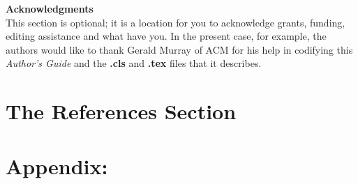 \documentclass[runningheads,a4paper]{llncs}
\begin{document}
\textbf{Acknowledgments} \\
This section is optional; it is a location for you
to acknowledge grants, funding, editing assistance and
what have you.  In the present case, for example, the
authors would like to thank Gerald Murray of ACM for
his help in codifying this \textit{Author's Guide}
and the \textbf{.cls} and \textbf{.tex} files that it describes.




























\section{The References Section}
\renewcommand\refname{}
\vspace*{-0.7cm}













\newpage

\section*{Appendix:}
\small
\end{document}
